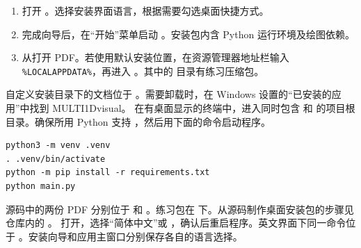 \begin{enumerate}
\item 打开 。选择安装界面语言，根据需要勾选桌面快捷方式。
\item 完成向导后，在“开始”菜单启动 。安装包内含 Python 运行环境及绘图依赖。
\item 从打开 PDF。若使用默认安装位置，在资源管理器地址栏输入 \texttt{\%LOCALAPPDATA\%}，再进入 。其中的  目录有练习压缩包。
\end{enumerate}
自定义安装目录下的文档位于 。需要卸载时，在 Windows 设置的“已安装的应用”中找到 MULTI1Dvisual。
在有桌面显示的终端中，进入同时包含  和  的项目根目录。确保所用 Python 支持 ，然后用下面的命令启动程序。
\begin{verbatim}
python3 -m venv .venv
. .venv/bin/activate
python -m pip install -r requirements.txt
python main.py
\end{verbatim}
源码中的两份 PDF 分别位于  和 。练习包在  下。从源码制作桌面安装包的步骤见仓库内的 。
打开，选择“简体中文”或 ，确认后重启程序。英文界面下同一命令位于 。安装向导和应用主窗口分别保存各自的语言选择。

